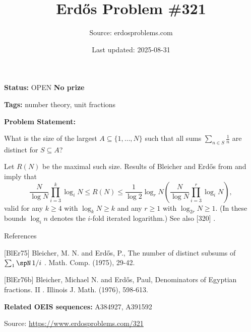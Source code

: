 \documentclass{article}
\title{Erd\H{o}s Problem \#321}
\date{Last updated: 2025-08-31}
\author{Source: erdosproblems.com}
\begin{document}
\maketitle

\noindent\textbf{Status:} OPEN \quad \textbf{No prize}

\noindent\textbf{Tags:} number theory, unit fractions

\medskip

\noindent\textbf{Problem Statement:}

What is the size of the largest $A\subseteq \{1,\ldots,N\}$ such that all sums $\sum_{n\in S}\frac{1}{n}$ are distinct for $S\subseteq A$?




Let $R(N)$ be the maximal such size. Results of Bleicher and Erd\H{o}s from \cite{BlEr75} and \cite{BlEr76b} imply that\[\frac{N}{\log N}\prod_{i=3}^k\log_iN\leq R(N)\leq \frac{1}{\log 2}\log_r N\left(\frac{N}{\log N} \prod_{i=3}^r \log_iN\right),\]valid for any $k\geq 4$ with $\log_kN\geq k$ and any $r\geq 1$ with $\log_{2r}N\geq 1$. (In these bounds $\log_in$ denotes the $i$-fold iterated logarithm.) See also [320] .




References

[BlEr75] Bleicher, M. N. and Erd\H{o}s, P., The number of distinct subsums of $\sum \sb{1}\spN\,1/i$ . Math. Comp. (1975), 29-42.

[BlEr76b] Bleicher, Michael N. and Erd\H{o}s, Paul, Denominators of Egyptian fractions. II . Illinois J. Math. (1976), 598-613.

\noindent\textbf{Related OEIS sequences:} A384927, A391592


\bigskip
\noindent\small{Source: \url{https://www.erdosproblems.com/321}}
\end{document}
